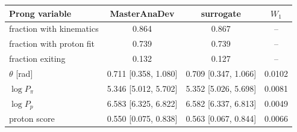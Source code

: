 \begin{tabular}{lccc}
\toprule
Prong variable & MasterAnaDev & surrogate & $W_1$ \\
\midrule
fraction with kinematics & 0.864 & 0.867 & -- \\
fraction with proton fit & 0.739 & 0.739 & -- \\
fraction exiting & 0.132 & 0.127 & -- \\
$\theta$ [rad] & 0.711 [0.358, 1.080] & 0.709 [0.347, 1.066] & 0.0102 \\
$\log P_\pi$ & 5.346 [5.012, 5.702] & 5.352 [5.026, 5.698] & 0.0081 \\
$\log P_p$ & 6.583 [6.325, 6.822] & 6.582 [6.337, 6.813] & 0.0049 \\
proton score & 0.550 [0.075, 0.838] & 0.563 [0.067, 0.844] & 0.0066 \\
\bottomrule
\end{tabular}
